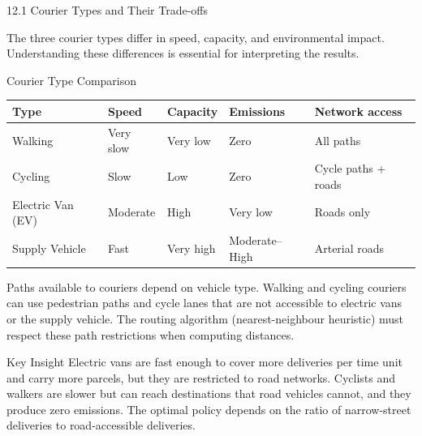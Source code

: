 \documentclass[aspectratio=169,10pt]{beamer}
\begin{document}
\begin{frame}[allowframebreaks]{12.1 Courier Types and Their Trade-offs}

The three courier types differ in speed, capacity, and environmental impact.
Understanding these differences is essential for interpreting the results.

\medskip

\begin{block}{Courier Type Comparison}
  \begin{tabular}{lllll}
    \toprule
    \textbf{Type} & \textbf{Speed} & \textbf{Capacity} & \textbf{Emissions} & \textbf{Network access} \\
    \midrule
    Walking & Very slow & Very low & Zero & All paths \\
    Cycling & Slow & Low & Zero & Cycle paths + roads \\
    Electric Van (EV) & Moderate & High & Very low & Roads only \\
    Supply Vehicle & Fast & Very high & Moderate--High & Arterial roads \\
    \bottomrule
  \end{tabular}
\end{block}

\medskip

Paths available to couriers depend on vehicle type.
Walking and cycling couriers can use pedestrian paths and cycle lanes
that are not accessible to electric vans or the supply vehicle.
The routing algorithm (nearest-neighbour heuristic) must respect
these path restrictions when computing distances.

\medskip

\begin{alertblock}{Key Insight}
  Electric vans are fast enough to cover more deliveries per time unit
  and carry more parcels, but they are restricted to road networks.
  Cyclists and walkers are slower but can reach destinations
  that road vehicles cannot, and they produce zero emissions.
  The optimal policy depends on the ratio of narrow-street
  deliveries to road-accessible deliveries.
\end{alertblock}

\end{frame}
\end{document}

